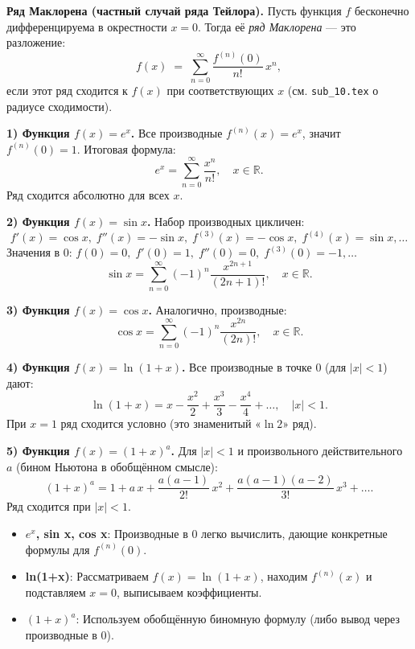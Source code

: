 

\textbf{Ряд Маклорена (частный случай ряда Тейлора).}
Пусть функция $f$ бесконечно дифференцируема в окрестности $x=0$. Тогда её \emph{ряд Маклорена} — это разложение:
\[
f(x) \;=\; \sum_{n=0}^{\infty} \frac{f^{(n)}(0)}{n!}\,x^n,
\]
если этот ряд сходится к $f(x)$ при соответствующих $x$ (см. \texttt{sub\_10.tex} о радиусе сходимости).

\medskip


\textbf{1) Функция $f(x)=e^x$.}
Все производные $f^{(n)}(x)=e^x$, значит $f^{(n)}(0)=1$. Итоговая формула:
\[
e^x = \sum_{n=0}^{\infty} \frac{x^n}{n!},\quad x \in \mathbb{R}.
\]
Ряд сходится абсолютно для всех $x$.

\textbf{2) Функция $f(x)=\sin x$.}
Набор производных цикличен:
\[
f'(x)=\cos x,\;f''(x)=-\sin x,\;f^{(3)}(x)=-\cos x,\;f^{(4)}(x)=\sin x,\dots
\]
Значения в 0: $f(0)=0,\; f'(0)=1,\; f''(0)=0,\; f^{(3)}(0)=-1,\dots$  
\[
\sin x = \sum_{n=0}^{\infty}(-1)^n \frac{x^{2n+1}}{(2n+1)!},\quad x \in \mathbb{R}.
\]

\textbf{3) Функция $f(x)=\cos x$.}
Аналогично, производные:
\[
\cos x = \sum_{n=0}^{\infty} (-1)^n \frac{x^{2n}}{(2n)!},\quad x\in\mathbb{R}.
\]

\textbf{4) Функция $f(x)=\ln(1+x)$.}
Все производные в точке 0 (для $|x|<1$) дают:
\[
\ln(1+x) = x - \frac{x^2}{2} + \frac{x^3}{3} - \frac{x^4}{4} + \dots,\quad |x|<1.
\]
При $x=1$ ряд сходится условно (это знаменитый «\(\ln 2\)» ряд).

\textbf{5) Функция $f(x)=(1+x)^a$.}
Для \(|x|<1\) и произвольного действительного $a$ (бином Ньютона в обобщённом смысле):
\[
(1+x)^a = 1 + a\,x + \frac{a(a-1)}{2!}\,x^2 + \frac{a(a-1)(a-2)}{3!}\,x^3 + \dots .
\]
Ряд сходится при $|x|<1$.

\medskip


\begin{itemize}
  \item \textbf{$e^x$, sin x, cos x}:  
    Производные в 0 легко вычислить, дающие конкретные формулы для $f^{(n)}(0)$.
  \item \textbf{ln(1+x)}:  
    Рассматриваем $f(x)=\ln(1+x)$, находим $f^{(n)}(x)$ и подставляем $x=0$, выписываем коэффициенты.  
  \item \textbf{$(1+x)^a$}:  
    Используем обобщённую биномную формулу (либо вывод через производные в 0).
\end{itemize}

